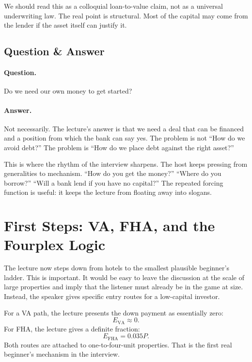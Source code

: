 We should read this as a colloquial loan-to-value claim, not as a universal underwriting law. The real point is structural. Most of the capital may come from the lender if the asset itself can justify it.

\subsection{Question \& Answer}

\paragraph{Question.} Do we need our own money to get started?

\paragraph{Answer.} Not necessarily. The lecture's answer is that we need a deal that can be financed and a position from which the bank can say yes. The problem is not ``How do we avoid debt?'' The problem is ``How do we place debt against the right asset?''

This is where the rhythm of the interview sharpens. The host keeps pressing from generalities to mechanism. ``How do you get the money?'' ``Where do you borrow?'' ``Will a bank lend if you have no capital?'' The repeated forcing function is useful: it keeps the lecture from floating away into slogans.

\section{First Steps: VA, FHA, and the Fourplex Logic}

The lecture now steps down from hotels to the smallest plausible beginner's ladder. This is important. It would be easy to leave the discussion at the scale of large properties and imply that the listener must already be in the game at size. Instead, the speaker gives specific entry routes for a low-capital investor.

For a VA path, the lecture presents the down payment as essentially zero:
\begin{equation}
E_{\mathrm{VA}} \approx 0.
\end{equation}
For FHA, the lecture gives a definite fraction:
\begin{equation}
E_{\mathrm{FHA}} = 0.035P.
\end{equation}
Both routes are attached to one-to-four-unit properties. That is the first real beginner's mechanism in the interview.

